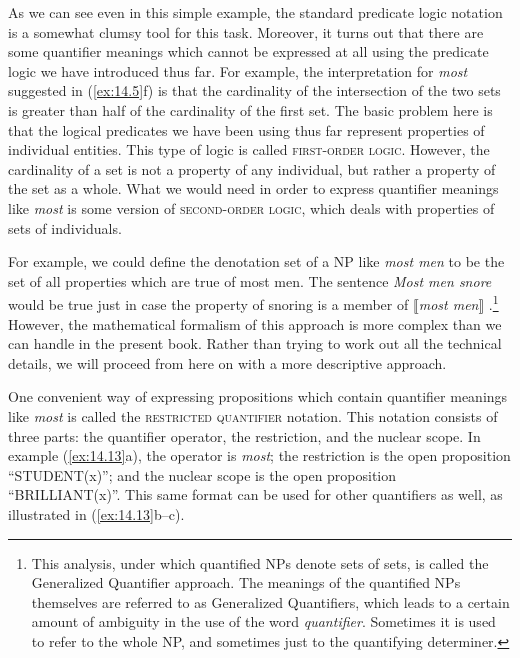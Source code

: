 As we can see even in this simple example, the standard predicate logic notation is a somewhat clumsy tool for this task. Moreover, it turns out that there are some quantifier meanings which cannot be expressed at all using the predicate logic we have introduced thus far. For example, the interpretation for \textit{most} suggested in (\ref{ex:14.5}f) is that the cardinality of the intersection of the two sets is greater than half of the cardinality of the first set. The basic problem here is that the logical predicates we have been using thus far represent properties of individual entities. This type of logic is called \textsc{first-order logic}. However, the cardinality of a set is not a property of any individual, but rather a property of the set as a whole. What we would need in order to express quantifier meanings like \textit{most} is some version of \textsc{second-order logic}, which deals with properties of sets of individuals.



For example, we could define the denotation set of a NP like \textit{most men} to be the set of all properties which are true of most men. The sentence \textit{Most men snore} would be true just in case the property of snoring is a member of $\llbracket$\textit{most men}$\rrbracket$ .\footnote{This analysis, under which quantified NPs denote sets of sets, is called the Generalized Quantifier approach. The meanings of the quantified NPs themselves are referred to as Generalized Quantifiers, which leads to a certain amount of ambiguity in the use of the word \textit{quantifier}. Sometimes it is used to refer to the whole NP, and sometimes just to the quantifying determiner.} However, the mathematical formalism of this approach is more complex than we can handle in the present book. Rather than trying to work out all the technical details, we will proceed from here on with a more descriptive approach.



One convenient way of expressing propositions which contain quantifier meanings like \textit{most} is called the \textsc{restricted quantifier} notation. This notation consists of three parts: the quantifier operator, the restriction, and the nuclear scope. In example (\ref{ex:14.13}a), the operator is \textit{most}; the restriction is the open proposition “STUDENT(x)”; and the nuclear scope is the open proposition “BRILLIANT(x)”. This same format can be used for other quantifiers as well, as illustrated in (\ref{ex:14.13}b--c).


